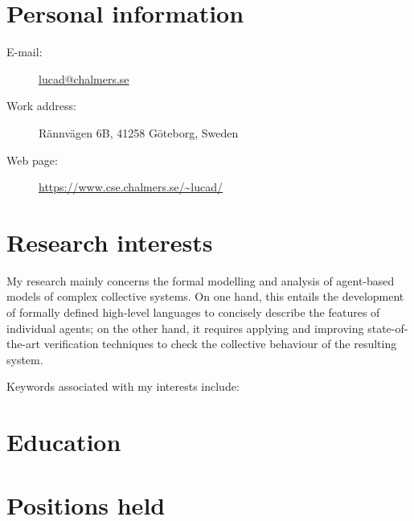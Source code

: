 \documentclass[11pt,a4paper]{moderncv}
\author{Luca Di Stefano}
\date{\today}
\begin{document}
\makeatletter
\bfseries
\noindent {\Large\@author}\vspace*{0.4em}

\normalfont
{}

\noindent{\monthyear\today}
\makeatother

\section*{Personal information}
\begin{description}
    \item[E-mail:] \href{mailto:lucad@chalmers.se}{lucad@chalmers.se} 
    \item[Work address:] Rännvägen 6B, 41258 Göteborg, Sweden
    \item[Web page:] \url{https://www.cse.chalmers.se/~lucad/} 
\end{description}

\section{Research interests}
My research mainly concerns the formal modelling and analysis of agent-based
models of complex collective systems.
On one hand, this entails the development of formally
defined high-level languages to concisely describe the features of individual
agents; on the other hand, it requires applying and improving state-of-the-art
verification techniques to check the collective behaviour of the resulting system.

Keywords associated with my interests include:


\section*{Education}


\clearpage

\section*{Positions held}

\end{document}
